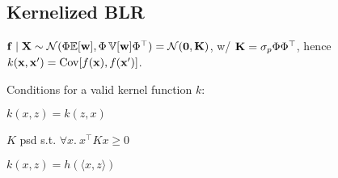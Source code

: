 



\subsection{Kernelized BLR}
  \(\vb{f} \mid \vb{X} \sim \operatorname{\mathcal{N}}(\Phi \mathbb{E}[\vb{w}], \Phi\operatorname{\mathbb{V}}[\vb{w}]\Phi^\top) = \operatorname{\mathcal{N}}(\vb{0}, \vb{K})\), w/ \(\vb{K} = \sigma_p\Phi\Phi^\top\), hence \(k(\vb{x}, \vb{x}') = \operatorname{Cov}[f(\vb{x}), f(\vb{x}')]\).

Conditions for a valid kernel function \(k\): \\
\begin{itemize*}
  \item \(k(x, z) = k(z, x)\)
  \item \(K\) psd s.t. \(\forall x. \ x^\top K x \geq 0 \)
\end{itemize*}

\begin{definition}
  \(k(x, z) = h(\langle x, z \rangle)\)
\end{definition}

